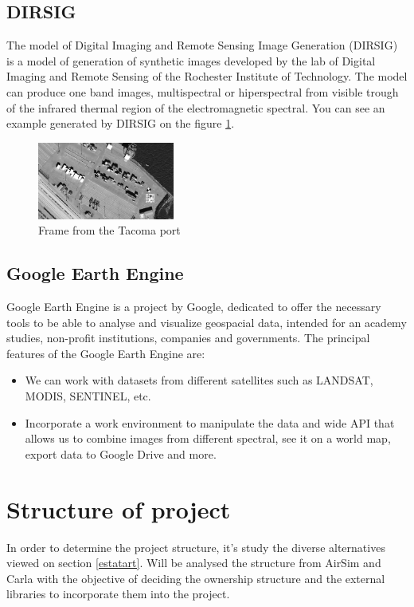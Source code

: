 \documentclass[10pt,a4paper,twocolumn,twoside]{article}
\begin{document}
\subsection{DIRSIG}
The model of Digital Imaging and Remote Sensing Image Generation (DIRSIG) is a model of generation of synthetic images developed by the lab of Digital Imaging and Remote Sensing of the Rochester Institute of Technology. The model can produce one band images, multispectral or hiperspectral from visible trough of the infrared thermal region of the electromagnetic spectral. You can see an example generated by DIRSIG on the figure \ref{fig-tacoma}.

\begin{figure}[!h]
\centering
  	\includegraphics[width=0.4\textwidth]{tacoma}
	\caption{Frame from the Tacoma port}
	\label{fig-tacoma}
\end{figure}

\subsection{Google Earth Engine}

Google Earth Engine is a project by Google, dedicated to offer the necessary tools to be able to analyse and visualize geospacial data, intended for an academy studies, non-profit institutions, companies and governments. The principal features of the Google Earth Engine are:

\begin{itemize}
  \item We can work with datasets from different satellites such as LANDSAT, MODIS, SENTINEL, etc.
  \item Incorporate a work environment to manipulate the data and wide API that allows us to combine images from different spectral, see it on a world map, export data to Google Drive and more.
\end{itemize}

\section{Structure of project}
In order to determine the project structure, it's study the diverse alternatives viewed on section \ref{estatart}. Will be analysed the structure from AirSim and Carla with the objective of deciding the ownership structure and the external libraries to incorporate them into the project.
\end{document}
